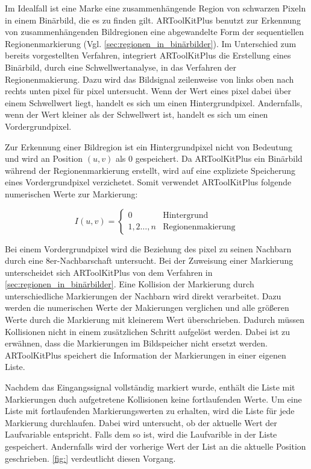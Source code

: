 Im Idealfall ist eine Marke eine zusammenhängende Region von schwarzen Pixeln in einem Binärbild, die es zu finden
 gilt. ARToolKitPlus benutzt zur Erkennung von zusammenhängenden Bildregionen eine abgewandelte Form der sequentiellen
 Regionenmarkierung (Vgl. \autoref{sec:regionen_in_binärbilder}). Im Unterschied zum bereits vorgestellten Verfahren,
 integriert ARToolKitPlus die Erstellung eines Binärbild, durch eine Schwellwertanalyse, in das Verfahren der
 Regionenmakierung. Dazu wird das Bildsignal zeilenweise von links oben nach rechts unten \gls{pixel} für \gls{pixel}
 untersucht. Wenn der Wert eines \gls{pixel} dabei über einem Schwellwert liegt, handelt es sich um einen
 Hintergrundpixel. Andernfalls, wenn der Wert kleiner als der Schwellwert ist, handelt es sich um einen
 Vordergrundpixel.

Zur Erkennung einer Bildregion ist ein Hintergrundpixel nicht von Bedeutung und wird an Position $(u,v)$ als $0$ gespeichert. Da ARToolKitPlus ein Binärbild während der Regionenmarkierung erstellt, wird auf eine expliziete Speicherung eines Vordergrundpixel verzichetet. Somit verwendet ARToolKitPlus folgende numerischen Werte zur Markierung:

\begin{equation*}
	I(u,v) = \begin{cases}
	0 & \textrm{Hintergrund}\\
	1,2\ldots,n & \textrm{Regionenmakierung}
	\end{cases}
\end{equation*}

Bei einem Vordergrundpixel wird die Beziehung des \gls{pixel} zu seinen Nachbarn durch eine 8er-Nachbarschaft
 untersucht. Bei der Zuweisung einer Markierung unterscheidet sich ARToolKitPlus von dem Verfahren in
 \autoref{sec:regionen_in_binärbilder}. Eine Kollision der Markierung durch unterschiedliche Markierungen der Nachbarn
 wird direkt verarbeitet. Dazu werden die numerischen Werte der Makierungen verglichen und alle größeren Werte durch
 die Markierung mit kleinerem Wert überschrieben. Dadurch müssen Kollisionen nicht in einem zusätzlichen Schritt
 aufgelöst werden. Dabei ist zu erwähnen, dass die Markierungen im Bildspeicher nicht ersetzt werden. ARToolKitPlus
 speichert die Information der Markierungen in einer eigenen Liste.

Nachdem das Eingangssignal vollständig markiert wurde, enthält die Liste mit Markierungen duch aufgetretene Kollisionen
 keine fortlaufenden Werte. Um eine Liste mit fortlaufenden Markierungswerten zu erhalten, wird die Liste für jede
 Markierung durchlaufen. Dabei wird untersucht, ob der aktuelle Wert der Laufvariable entspricht. Falls dem so ist,
 wird die Laufvarible in der Liste gespeichert. Andernfalls wird der vorherige Wert der List an die aktuelle Position
 geschrieben. \autoref{fig:} verdeutlicht diesen Vorgang.

